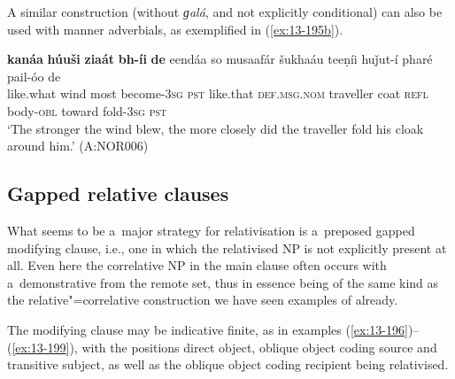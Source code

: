 A similar construction (without \textit{ɡalá}, and not explicitly conditional) can also be used with manner adverbials, as exemplified in (\ref{ex:13-195b}).

\begin{exe}
\ex
\label{ex:13-195b}
\gll \textbf{kanáa} \textbf{húuši} \textbf{ziaát} \textbf{bh-íi} \textbf{de} eendáa so musaafár šukhaáu teeṇíi huǰut-í pharé pail-óo de\\
like.what wind most become-\textsc{3sg} \textsc{pst} like.that \textsc{def.msg.nom} traveller coat \textsc{refl} body-\textsc{obl} toward fold-\textsc{3sg} \textsc{pst} \\
\glt `The stronger the wind blew, the more closely did the traveller fold his cloak around him.' (A:NOR006)
\end{exe}


\subsection{Gapped relative clauses}
\label{subsec:13-6-3}


What seems to be a~major strategy for relativisation is a~preposed gapped modifying clause, i.e., one in which the relativised NP is not explicitly present at all. Even here the correlative NP in the main clause often occurs with a~demonstrative from the remote set, thus in essence being of the same kind as the relative"=correlative construction we have seen examples of already.


The modifying clause may be indicative finite, as in examples (\ref{ex:13-196})--(\ref{ex:13-199}), with the positions direct object, oblique object coding source and transitive subject, as well as the oblique object coding recipient being relativised.

